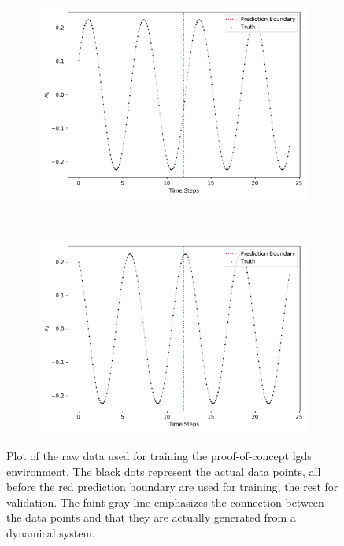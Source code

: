 			\begin{figure}
				\centering
				\begin{subfigure}{0.5\linewidth}
					\centering
					\includegraphics[width=\linewidth]{figures/experiments/environments/observations-lgds-N0-D0.pdf}
				\end{subfigure}%
				~
				\begin{subfigure}{0.5\linewidth}
					\centering
					\includegraphics[width=\linewidth]{figures/experiments/environments/observations-lgds-N0-D1.pdf}
				\end{subfigure}
				\caption{Plot of the raw data used for training the proof-of-concept \ac{lgds} environment. The black dots represent the actual data points, all before the red prediction boundary are used for training, the rest for validation. The faint gray line emphasizes the connection between the data points and that they are actually generated from a dynamical system.}
				\label{fig:envLgds}
			\end{figure}

